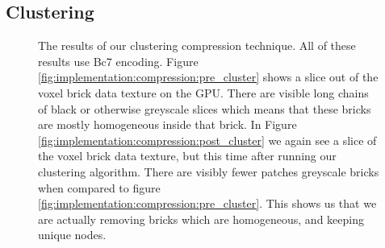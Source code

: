 \begin{figure}[H]
    \centering

    \caption{} \label{fig:implementation:compression:bc}
\end{figure}
\subsection{Clustering} \label{results:clustering}


\begin{figure}[H]
    \centering
    \hfill
    \caption{The results of our clustering compression technique. All of these results use Bc7 encoding. Figure \ref{fig:implementation:compression:pre_cluster} shows a slice out of the voxel brick data texture on the GPU. There are visible long chains of black or otherwise greyscale slices which means that these bricks are mostly homogeneous inside that brick. In Figure \ref{fig:implementation:compression:post_cluster} we again see a slice of the voxel brick data texture, but this time after running our clustering algorithm. There are visibly fewer patches greyscale bricks when compared to figure \ref{fig:implementation:compression:pre_cluster}. This shows us that we are actually removing bricks which are homogeneous, and keeping unique nodes.} \label{fig:implementation:compression:cluster}
\end{figure}